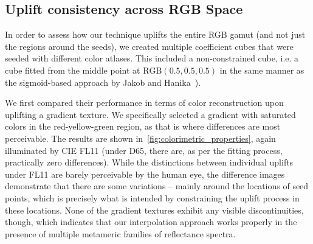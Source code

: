 \subsection{Uplift consistency across RGB Space}

In order to assess how our technique uplifts the entire RGB gamut (and not just the regions around the seeds), we created multiple coefficient cubes that were seeded with different color atlases. This included a non-constrained cube, i.e. a cube fitted from the middle point at $\mathrm{RGB}(0.5,0.5,0.5)$ in the same manner as the sigmoid-based approach by Jakob and Hanika~\cite{upsamplingJakobHanika}). 

We first compared their performance in terms of color reconstruction upon uplifting a gradient texture. We specifically selected a gradient with saturated colors in the red-yellow-green region, as that is where differences are most perceivable. The results are shown in~\cref{fig:colorimetric_properties}, again illuminated by CIE FL11 (under D65, there are, as per the fitting process, practically zero differences). While the distinctions between individual uplifts under FL11 are barely perceivable by the human eye, the difference images demonstrate that there are some variations -- mainly around the locations of seed points, which is precisely what is intended by constraining the uplift process in these locations. None of the gradient textures exhibit any visible discontinuities, though, which indicates that our interpolation approach works properly in the presence of multiple metameric families of reflectance spectra.


